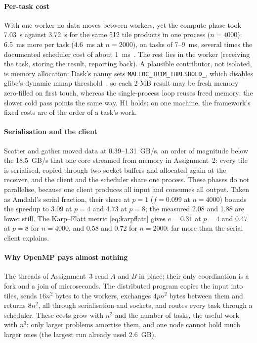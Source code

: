\documentclass[conference,a4paper]{IEEEtran}
\newcommand{\code}[1]{\texttt{#1}}
\begin{document}
\paragraph{Per-task cost} With one worker no data moves between workers, yet
the compute phase took 7.03~s against 3.72~s for the same 512 tile products in
one process ($n = 4000$): 6.5~ms more per task (4.6~ms at $n = 2000$), on tasks
of 7--9~ms, several times the documented scheduler cost of about
1~ms~\cite{daskeff}. The rest lies in the worker (receiving the task, storing
the result, reporting back). A plausible contributor, not isolated, is memory
allocation: Dask's nanny sets \code{MALLOC\_TRIM\_THRESHOLD\_}, which disables
glibc's dynamic mmap threshold~\cite{mallopt}, so each 2-MB result may be fresh
memory zero-filled on first touch, whereas the single-process loop reuses
freed memory; the slower cold pass points the same way. H1 holds: on one
machine, the framework's fixed costs are of the order of a task's work.

\paragraph{Serialisation and the client} Scatter and gather moved data at
0.39--1.31~GB/s, an order of magnitude below the 18.5~GB/s that one core streamed
from memory in Assignment~2: every tile is serialised, copied through two
socket buffers and allocated again at the receiver, and the client and the
scheduler share one process. These phases do not parallelise, because one
client produces all input and consumes all output. Taken as Amdahl's serial
fraction, their share at $p = 1$ ($f = 0.099$ at $n = 4000$) bounds the speedup
to 3.09 at $p = 4$ and 4.73 at $p = 8$; the measured 2.08 and 1.88 are lower
still. The Karp--Flatt metric \eqref{eq:karpflatt} gives $e = 0.31$ at $p = 4$
and 0.47 at $p = 8$ for $n = 4000$, and 0.58 and 0.72 for $n = 2000$: far more
than the serial client explains.

\paragraph{Why OpenMP pays almost nothing} The threads of Assignment~3 read $A$
and $B$ in place; their only coordination is a fork and a join of
microseconds. The distributed program copies the input into tiles, sends
$16n^2$ bytes to the workers, exchanges $4pn^2$ bytes between them and returns
$8n^2$, all through serialisation and sockets, and routes every task through a
scheduler. These costs grow with $n^2$ and the number of tasks, the useful work
with $n^3$: only larger problems amortise them, and one node cannot hold much
larger ones (the largest run already used 2.6~GB).
\end{document}
